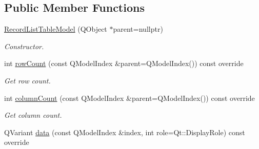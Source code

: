 \subsection*{Public Member Functions}
\begin{DoxyCompactItemize}
\item 
\hyperlink{class_mdt_1_1_plain_text_1_1_record_list_table_model_a8f620b5691a0a5e739dbb0fbc511dc3d}{Record\+List\+Table\+Model} (Q\+Object $\ast$parent=nullptr)\hypertarget{class_mdt_1_1_plain_text_1_1_record_list_table_model_a8f620b5691a0a5e739dbb0fbc511dc3d}{}\label{class_mdt_1_1_plain_text_1_1_record_list_table_model_a8f620b5691a0a5e739dbb0fbc511dc3d}

\begin{DoxyCompactList}\small\item\em Constructor. \end{DoxyCompactList}\item 
int \hyperlink{class_mdt_1_1_plain_text_1_1_record_list_table_model_a008f00dbfb47b039abaee9a23285ed91}{row\+Count} (const Q\+Model\+Index \&parent=Q\+Model\+Index()) const override\hypertarget{class_mdt_1_1_plain_text_1_1_record_list_table_model_a008f00dbfb47b039abaee9a23285ed91}{}\label{class_mdt_1_1_plain_text_1_1_record_list_table_model_a008f00dbfb47b039abaee9a23285ed91}

\begin{DoxyCompactList}\small\item\em Get row count. \end{DoxyCompactList}\item 
int \hyperlink{class_mdt_1_1_plain_text_1_1_record_list_table_model_a92b06d3a99bc39778893ea45c41e294d}{column\+Count} (const Q\+Model\+Index \&parent=Q\+Model\+Index()) const override\hypertarget{class_mdt_1_1_plain_text_1_1_record_list_table_model_a92b06d3a99bc39778893ea45c41e294d}{}\label{class_mdt_1_1_plain_text_1_1_record_list_table_model_a92b06d3a99bc39778893ea45c41e294d}

\begin{DoxyCompactList}\small\item\em Get column count. \end{DoxyCompactList}\item 
Q\+Variant \hyperlink{class_mdt_1_1_plain_text_1_1_record_list_table_model_a21f6d39cf524905be29c3668054d7cc5}{data} (const Q\+Model\+Index \&index, int role=Qt\+::\+Display\+Role) const override\hypertarget{class_mdt_1_1_plain_text_1_1_record_list_table_model_a21f6d39cf524905be29c3668054d7cc5}{}\label{class_mdt_1_1_plain_text_1_1_record_list_table_model_a21f6d39cf524905be29c3668054d7cc5}


\end{DoxyCompactItemize}
